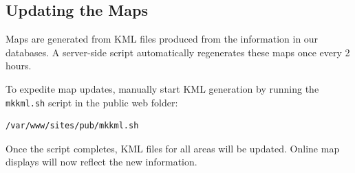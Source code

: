 \documentclass[pdflatex,letterpaper,twoside,12pt]{book}
\begin{document}
\subsection{Updating the Maps}

Maps are generated from KML files produced from the information in our databases.  A server-side script automatically regenerates these maps once every 2 hours.

To expedite map updates, manually start KML generation by running the \texttt{mkkml.sh} script in the public web folder:

\begin{verbatim}
/var/www/sites/pub/mkkml.sh
\end{verbatim}

Once the script completes, KML files for all areas will be updated.  Online map displays will now reflect the new information.
\end{document}
